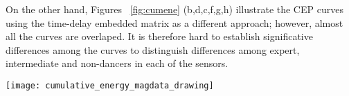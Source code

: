 \documentclass{sigchi}
\begin{document}
On the other hand, Figures ~\ref{fig:cumene} (b,d,c,f,g,h) illustrate the CEP curves using the time-delay embedded matrix as a different approach;
however, almost all the curves are overlaped.
It is therefore hard to establish significative differences among the curves to distinguish differences among expert, intermediate and 
non-dancers in each of the sensors.
\begin{figure*}[!t]
\centering    
\texttt{[image: cumulative\_energy\_magdata\_drawing]}
\caption[PA]{Cumulative energy percentage curves using the magnetometer sensor.
(a,e) curves are based on the triaxial raw data.
(b,d,c,f,g,h) curves are based on the time-delay embedded data for axis $x$, $y$ and $z$.
Curves are for expert, intermediate and non-dancer users for step 1 and step 2.}
\label{fig:cumene}
\end{figure*}
% 
% 
% 
\end{document}
